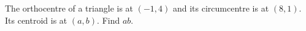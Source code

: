 The orthocentre of a triangle is at $(-1,4)$ and its circumcentre is at $(8,1)$. Its centroid is at $(a,b)$. Find $ab$.
